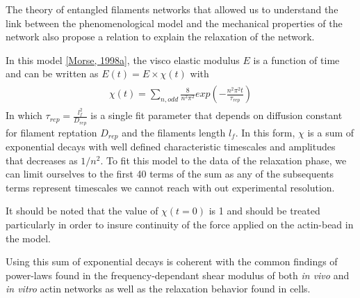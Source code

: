 \documentclass[A4paperpaper,11pt,english]{sphinxmanual}
\begin{document}
The theory of entangled filaments networks that allowed us to understand the link between the phenomenological
model and the mechanical properties of the network also propose a relation to
explain the relaxation of the network.

In this model {\hyperref[parts/part3:morse1998a]{{[}Morse,  1998a{]}}}, the visco elastic modulus  \(E\) is a function of time
and can be written as \(E(t) = E\times \chi(t)\) with
\label{parts/part3:equation-chi}\begin{gather}
\begin{split}\chi(t)=\sum_{n, odd} \frac{8}{n^2 \pi^2}exp\left(- \frac{n^2\pi^2 t}{ \tau_{rep}} \right)\end{split}\label{parts/part3-chi}
\end{gather}
In which \(\tau_{rep} = \frac{l_f^2}{D_{rep}}\) is a single fit parameter
that depends on diffusion constant for filament reptation \(D_{rep}\) and the
filaments length \(l_f\). In this form, \(\chi\) is a sum of
exponential decays with well defined characteristic timescales and amplitudes
that decreases as \(1/n^2\). To fit this model to the data of the
relaxation phase, we can limit ourselves to the first 40 terms of the sum as
any of the subsequents terms represent timescales we cannot reach with out
experimental resolution.

It should be noted that  the value of \(\chi(t=0)\) is 1 and should be
treated particularly in order to insure continuity of the force applied on the
actin-bead in the model.

Using this sum of exponential decays is coherent with the common findings of
power-laws found in the frequency-dependant shear modulus of both \emph{in vivo} and \emph{in vitro} actin
networks as well as the relaxation behavior found in cells.
\end{document}
